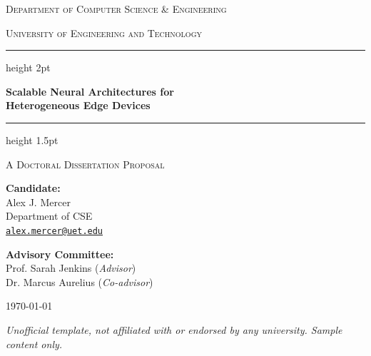 \documentclass[11pt,a4paper]{article}
\begin{document}
\begin{titlepage}
    \centering
    \vspace*{1.0cm}
    
    {\scshape\large Department of Computer Science \& Engineering \par}
    {\scshape\normalsize University of Engineering and Technology \par}
    
    \vspace{2.2cm}
    
    {\color{accent}\hrule height 2pt}
    \vspace{0.4cm}
    {\Huge\bfseries\color{accent} Scalable Neural Architectures for\\ Heterogeneous Edge Devices\par}
    \vspace{0.4cm}
    {\color{accent}\hrule height 1.5pt}
    
    \vspace{1.5cm}
    
    {\large\scshape A Doctoral Dissertation Proposal\par}
    
    \vspace{2.2cm}
    
    \begin{minipage}[t]{0.45\textwidth}
        \flushleft
        \textbf{Candidate:}\\
        Alex J. Mercer\\
        Department of CSE\\
        \href{mailto:alex.mercer@uet.edu}{\texttt{alex.mercer@uet.edu}}
    \end{minipage}
    \hfill
    \begin{minipage}[t]{0.45\textwidth}
        \flushright
        \textbf{Advisory Committee:}\\
        Prof. Sarah Jenkins (\textit{Advisor})\\
        Dr. Marcus Aurelius (\textit{Co-advisor})
    \end{minipage}
    
    \vfill
    
    {\large \today \par}
    
    \vspace{1.0cm}
    \vfill
    {\footnotesize\itshape Unofficial template, not affiliated with or endorsed by any university. Sample content only.\par}
\end{titlepage}
\end{document}
